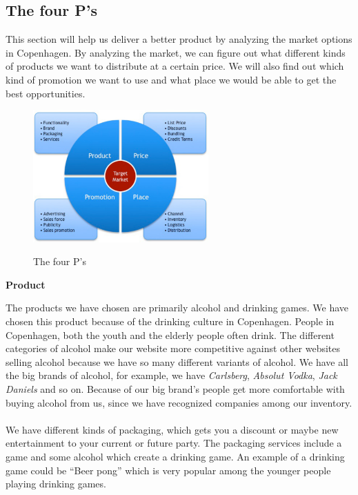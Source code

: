 \documentclass[12p]{article}
\begin{document}
\newpage


\subsection{The four P's}

This section will help us deliver a better product by analyzing the market options in Copenhagen. By analyzing the market, we can figure out what different kinds of products we want to distribute at a certain price. We will also find out which kind of promotion we want to use and what place we would be able to get the best opportunities. 

\begin{figure}[h]
    \center
    \includegraphics[width=0.6\textwidth]{4p}
    \label{PPPP}
    \caption{The four P's}
\end{figure}

\textbf{Product}

The products we have chosen are primarily alcohol and drinking games. We have chosen this product because of the drinking culture in Copenhagen. People in Copenhagen, both the youth and the elderly people often drink. The different categories of alcohol make our website more competitive against other websites selling alcohol because we have so many different variants of alcohol. We have all the big brands of alcohol, for example, we have \emph{Carlsberg}, \emph{Absolut Vodka}, \emph{Jack Daniels} and so on. Because of our big brand's people get more comfortable with buying alcohol from us, since we have recognized companies among our inventory. 
\\ \\
We have different kinds of packaging, which gets you a discount or maybe new entertainment to your current or future party. The packaging services include a game and some alcohol which create a drinking game. An example of a drinking game could be “Beer pong” which is very popular among the younger people playing drinking games. \\
\end{document}
